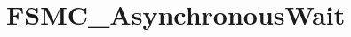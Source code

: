 \hypertarget{group___f_s_m_c___asynchronous_wait}{\section{F\-S\-M\-C\-\_\-\-Asynchronous\-Wait}
\label{group___f_s_m_c___asynchronous_wait}
}
